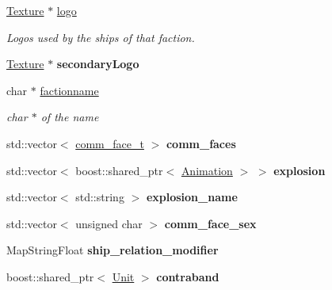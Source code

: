 \begin{DoxyCompactItemize}
\item 
\hyperlink{classTexture}{Texture} $\ast$ \hyperlink{classFaction_a26377103e73c631aebd1c05c84bf42b7}{logo}\hypertarget{classFaction_a26377103e73c631aebd1c05c84bf42b7}{}\label{classFaction_a26377103e73c631aebd1c05c84bf42b7}

\begin{DoxyCompactList}\small\item\em Logos used by the ships of that faction. \end{DoxyCompactList}\item 
\hyperlink{classTexture}{Texture} $\ast$ {\bfseries secondary\+Logo}\hypertarget{classFaction_a3434584472d3de98752765cbe581b085}{}\label{classFaction_a3434584472d3de98752765cbe581b085}

\item 
char $\ast$ \hyperlink{classFaction_ae9a90b799c0b0c78a163c2dd97be244d}{factionname}\hypertarget{classFaction_ae9a90b799c0b0c78a163c2dd97be244d}{}\label{classFaction_ae9a90b799c0b0c78a163c2dd97be244d}

\begin{DoxyCompactList}\small\item\em char $\ast$ of the name \end{DoxyCompactList}\item 
std\+::vector$<$ \hyperlink{structFaction_1_1comm__face__t}{comm\+\_\+face\+\_\+t} $>$ {\bfseries comm\+\_\+faces}\hypertarget{classFaction_a36451a2afb7c15435f60f35c09318e17}{}\label{classFaction_a36451a2afb7c15435f60f35c09318e17}

\item 
std\+::vector$<$ boost\+::shared\+\_\+ptr$<$ \hyperlink{classAnimation}{Animation} $>$ $>$ {\bfseries explosion}\hypertarget{classFaction_a6490e63a206ed1160c66e42739d85143}{}\label{classFaction_a6490e63a206ed1160c66e42739d85143}

\item 
std\+::vector$<$ std\+::string $>$ {\bfseries explosion\+\_\+name}\hypertarget{classFaction_a2a7df1ab88bae97559856c5609b83804}{}\label{classFaction_a2a7df1ab88bae97559856c5609b83804}

\item 
std\+::vector$<$ unsigned char $>$ {\bfseries comm\+\_\+face\+\_\+sex}\hypertarget{classFaction_a9c0e7f834633733c79ea48e8ce5cd915}{}\label{classFaction_a9c0e7f834633733c79ea48e8ce5cd915}

\item 
Map\+String\+Float {\bfseries ship\+\_\+relation\+\_\+modifier}\hypertarget{classFaction_a9e36747ebe78c255b70abcfec0a40495}{}\label{classFaction_a9e36747ebe78c255b70abcfec0a40495}

\item 
boost\+::shared\+\_\+ptr$<$ \hyperlink{classUnit}{Unit} $>$ {\bfseries contraband}\hypertarget{classFaction_a130cdc7d544bdfb2cf1f2ba7d3fd7487}{}\label{classFaction_a130cdc7d544bdfb2cf1f2ba7d3fd7487}

\end{DoxyCompactItemize}


